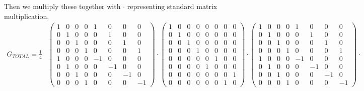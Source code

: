 \documentclass[10pt]{article}
\theoremstyle{definition}
\begin{document}
Then we multiply these together with $\cdot$ representing standard matrix multiplication,
\begin{align*}
  G_{TOTAL}=\frac{1}{4} & \begin{pmatrix}
                            1 & 0 & 0 & 0 & 1  & 0  & 0  & 0  \\
                            0 & 1 & 0 & 0 & 0  & 1  & 0  & 0  \\
                            0 & 0 & 1 & 0 & 0  & 0  & 1  & 0  \\
                            0 & 0 & 0 & 1 & 0  & 0  & 0  & 1  \\
                            1 & 0 & 0 & 0 & -1 & 0  & 0  & 0  \\
                            0 & 1 & 0 & 0 & 0  & -1 & 0  & 0  \\
                            0 & 0 & 1 & 0 & 0  & 0  & -1 & 0  \\
                            0 & 0 & 0 & 1 & 0  & 0  & 0  & -1
                          \end{pmatrix}\cdot
  \begin{pmatrix}
    1 & 0 & 0 & 0 & 0 & 0 & 0 & 0 \\
    0 & 1 & 0 & 0 & 0 & 0 & 0 & 0 \\
    0 & 0 & 1 & 0 & 0 & 0 & 0 & 0 \\
    0 & 0 & 0 & 1 & 0 & 0 & 0 & 0 \\
    0 & 0 & 0 & 0 & 0 & 1 & 0 & 0 \\
    0 & 0 & 0 & 0 & 1 & 0 & 0 & 0 \\
    0 & 0 & 0 & 0 & 0 & 0 & 0 & 1 \\
    0 & 0 & 0 & 0 & 0 & 0 & 1 & 0
  \end{pmatrix}\cdot
  \begin{pmatrix}
    1 & 0 & 0 & 0 & 1  & 0  & 0  & 0  \\
    0 & 1 & 0 & 0 & 0  & 1  & 0  & 0  \\
    0 & 0 & 1 & 0 & 0  & 0  & 1  & 0  \\
    0 & 0 & 0 & 1 & 0  & 0  & 0  & 1  \\
    1 & 0 & 0 & 0 & -1 & 0  & 0  & 0  \\
    0 & 1 & 0 & 0 & 0  & -1 & 0  & 0  \\
    0 & 0 & 1 & 0 & 0  & 0  & -1 & 0  \\
    0 & 0 & 0 & 1 & 0  & 0  & 0  & -1
  \end{pmatrix}\cdot                                          \\

\end{align*}
\end{document}
